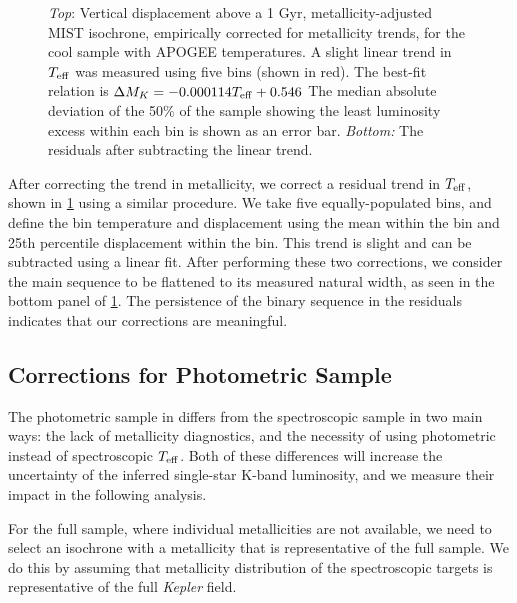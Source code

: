 \documentclass[manuscript]{aastex6}
\newcommand{\Kepler}{\mbox{\textit{Kepler}}}
\newcommand{\Teff}{\ensuremath{T_{\rm eff}}}
\newcommand{\MK}{\ensuremath{M_K}}
\begin{document}
\begin{figure}[htb]
    \centering
    \caption{\emph{Top}: Vertical displacement above a 1 Gyr,
        metallicity-adjusted MIST isochrone, empirically corrected for
        metallicity trends, for the cool sample with APOGEE temperatures. 
        A slight linear trend in \Teff{} was measured using five bins (shown in
        red). The best-fit relation is \(\Delta \MK{} = -0.000114
        \Teff{} + 0.546\) The median absolute deviation of the 50\% of the 
        sample showing the least luminosity excess within each bin is shown as 
        an error bar. \emph{Bottom:} The residuals after subtracting the 
        linear trend.}\label{fig:apogee_teff_trend}
\end{figure}

After correcting the trend in metallicity, we correct a residual trend in
\Teff{}, shown in \cref{fig:apogee_teff_trend} using a similar procedure. We
take five equally-populated bins, and define the bin temperature and 
displacement using the mean within the bin  and 25th percentile displacement
within the bin.  This trend is slight and can be subtracted using a linear 
fit. After performing these two corrections, we consider the main sequence to be 
flattened to its measured natural width, as seen in the bottom panel of 
\cref{fig:apogee_teff_trend}. The persistence of the binary sequence in the 
residuals indicates that our corrections are meaningful.  

\subsection{Corrections for Photometric Sample}

The photometric sample in \citet{McQuillan14} differs from the spectroscopic
sample in two main ways: the lack of metallicity diagnostics, and the necessity
of using photometric instead of spectroscopic \Teff{}. Both of these
differences will increase the uncertainty of the inferred single-star K-band
luminosity, and we measure their impact in the following analysis.

For the full \citet{McQuillan14} sample, where individual metallicities are not
available, we need to select an isochrone with a metallicity that is 
representative of the full sample. We do this by assuming that metallicity 
distribution of the spectroscopic targets is representative of the full 
\Kepler{} field. 
\end{document}
